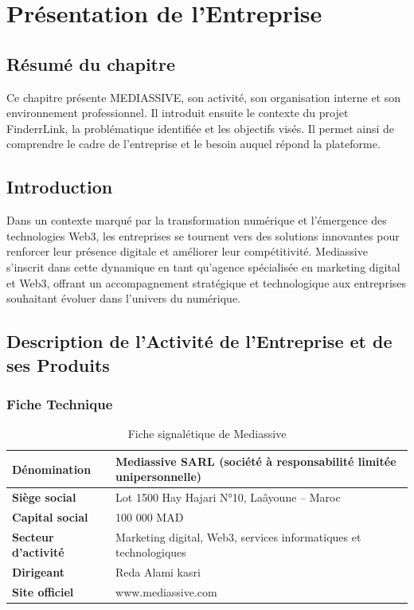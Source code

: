 \chapter{Présentation de l'Entreprise}
\section*{Résumé du chapitre}

Ce chapitre présente MEDIASSIVE, son activité, son organisation interne et son environnement professionnel. Il introduit ensuite le contexte du projet FinderrLink, la problématique identifiée et les objectifs visés. Il permet ainsi de comprendre le cadre de l'entreprise et le besoin auquel répond la plateforme.

\section{Introduction}

Dans un contexte marqué par la transformation numérique et l'émergence des technologies Web3, les entreprises se tournent vers des solutions innovantes pour renforcer leur présence digitale et améliorer leur compétitivité. Mediassive s'inscrit dans cette dynamique en tant qu'agence spécialisée en marketing digital et Web3, offrant un accompagnement stratégique et technologique aux entreprises souhaitant évoluer dans l'univers du numérique.

\section{Description de l'Activité de l'Entreprise et de ses Produits}

\subsection{Fiche Technique}

\begin{table}[H]
    \centering
    \begin{tabular}{|l|l|}
    \hline
    \textbf{Dénomination} & Mediassive SARL (société à responsabilité limitée unipersonnelle) \\
    \hline
    \textbf{Siège social} & Lot 1500 Hay Hajari N°10, Laâyoune – Maroc \\
    \hline
    \textbf{Capital social} & 100 000 MAD \\
    \hline
    \textbf{Secteur d'activité} & Marketing digital, Web3, services informatiques et technologiques \\
    \hline
    \textbf{Dirigeant} & Reda Alami kasri \\
    \hline
    \textbf{Site officiel} & www.mediassive.com \\
    \hline
    \end{tabular}
    
    \caption{Fiche signalétique de Mediassive}
    \label{tab:fichesignaletique}
    \end{table}

